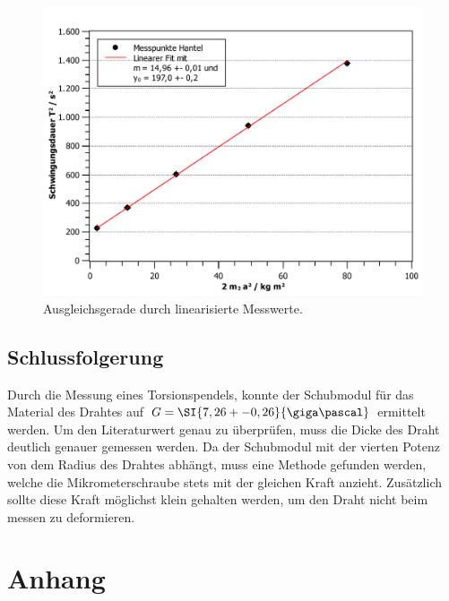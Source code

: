 \begin{figure}[ht]
	\includegraphics[width=\textwidth]{Torsion_Hantel_linear.pdf}
	\caption{Ausgleichsgerade durch linearisierte Messwerte.}
	\label{fig:hantel-fit}
\end{figure}

\subsection{Schlussfolgerung}
Durch die Messung eines Torsionspendels, konnte der Schubmodul für das Material des Drahtes auf $G = \SI{7,26+-0,26}{\giga\pascal}$ ermittelt werden.
Um den Literaturwert genau zu überprüfen, muss die Dicke des Draht deutlich genauer gemessen werden.
Da der Schubmodul mit der vierten Potenz von dem Radius des Drahtes abhängt, muss eine Methode gefunden werden, welche die Mikrometerschraube stets mit der gleichen Kraft anzieht.
Zusätzlich sollte diese Kraft möglichst klein gehalten werden, um den Draht nicht beim messen zu deformieren.

\newpage

\section{Anhang}

